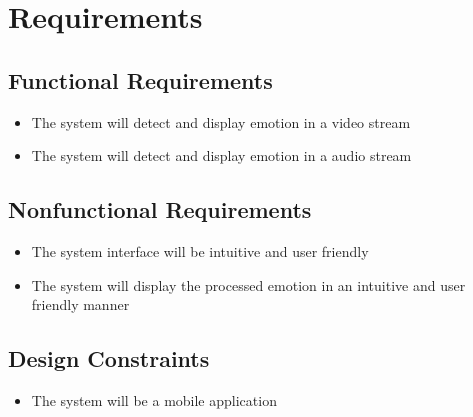 \chapter{Requirements}
\section{Functional Requirements}
\normalsize
\begin{itemize}
    \item The system will detect and display emotion in a video stream
    \item The system will detect and display emotion in a audio stream
\end{itemize}
\section{Nonfunctional Requirements}
\begin{itemize}
    \item The system interface will be intuitive and user friendly
    \item The system will display the processed emotion in an intuitive and user friendly manner
\end{itemize}
\section{Design Constraints}
\begin{itemize}
    \item The system will be a mobile application
\end{itemize}